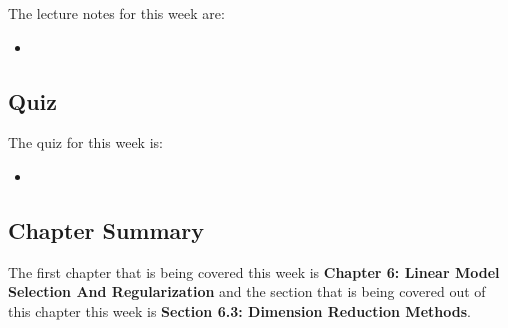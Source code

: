 \noindent The lecture notes for this week are:

\begin{itemize}
    \item {}
\end{itemize}

\subsection{Quiz}

The quiz for this week is:

\begin{itemize}
    \item {}
\end{itemize}

\newpage

\subsection{Chapter Summary}

The first chapter that is being covered this week is \textbf{Chapter 6: Linear Model Selection And Regularization} and the section that is being covered out of this chapter this week is \textbf{Section 6.3: Dimension Reduction Methods}.

